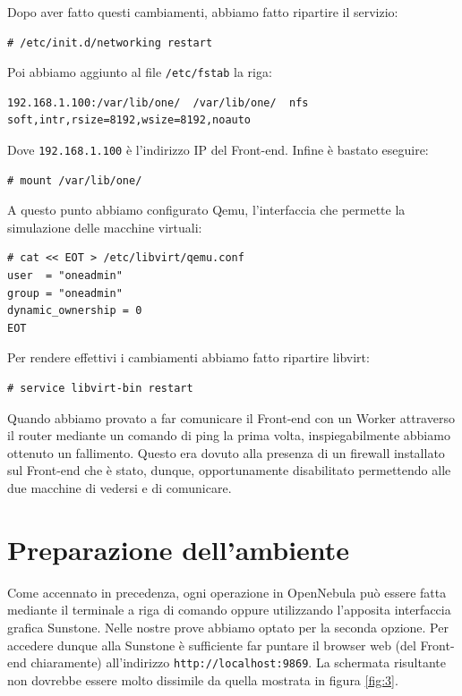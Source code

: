 \documentclass[twoside]{article}
\begin{document}
Dopo aver fatto questi cambiamenti, abbiamo fatto ripartire il servizio:
\begin{lstlisting}[frame=trBL]
# /etc/init.d/networking restart
\end{lstlisting}

Poi abbiamo aggiunto al file \texttt{/etc/fstab} la riga:
\begin{lstlisting}[frame=trBL]
192.168.1.100:/var/lib/one/  /var/lib/one/  nfs   soft,intr,rsize=8192,wsize=8192,noauto
\end{lstlisting}

Dove \texttt{192.168.1.100} è l'indirizzo IP del Front-end. Infine è bastato eseguire:
\begin{lstlisting}[frame=trBL]
# mount /var/lib/one/
\end{lstlisting}

A questo punto abbiamo configurato Qemu, l'interfaccia che permette la simulazione delle macchine virtuali:
\begin{lstlisting}[frame=trBL]
# cat << EOT > /etc/libvirt/qemu.conf
user  = "oneadmin"
group = "oneadmin"
dynamic_ownership = 0
EOT
\end{lstlisting}

Per rendere effettivi i cambiamenti abbiamo fatto ripartire libvirt:
\begin{lstlisting}[frame=trBL]
# service libvirt-bin restart
\end{lstlisting}

Quando abbiamo provato a far comunicare il Front-end con un Worker attraverso il router
mediante un comando di ping la prima volta, inspiegabilmente abbiamo ottenuto un fallimento. Questo
era dovuto alla presenza di un firewall installato sul Front-end che è stato, dunque, opportunamente
disabilitato permettendo alle due macchine di vedersi e di comunicare.

\section{Preparazione dell'ambiente}
Come accennato in precedenza, ogni operazione in OpenNebula può essere fatta mediante
il terminale a riga di comando oppure utilizzando l'apposita interfaccia grafica Sunstone. Nelle nostre
prove abbiamo optato per la seconda opzione. Per accedere dunque alla Sunstone è sufficiente far puntare il
browser web (del Front-end chiaramente) all'indirizzo \texttt{http://localhost:9869}. La schermata
risultante non dovrebbe essere molto dissimile da quella mostrata in figura \ref{fig:3}.
\end{document}
